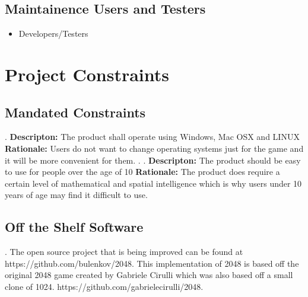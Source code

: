 \documentclass[12pt]{amsart}
\begin{document}
\subsection{Maintainence Users and Testers}
\begin{itemize}
\item Developers/Testers
\end{itemize}

\section{Project Constraints}
\subsection{Mandated Constraints}
.\newline
\textbf{Descripton:} The product shall operate using Windows, Mac OSX and LINUX
\textbf{Rationale:} Users do not want to change operating systems just for the game and it will be more convenient for them. 
.\newline
.\newline
\textbf{Descripton:} The product should be easy to use for people over the age of 10
\textbf{Rationale:} The product does require a certain level of mathematical and spatial intelligence which is why users under 10 years of age may find it difficult to use. 

\subsection{Off the Shelf Software}
.\newline
The open source project that is being improved can be found at https://github.com/bulenkov/2048.
This implementation of 2048 is based off the original 2048 game created by Gabriele Cirulli which was also based off a small clone of 1024. https://github.com/gabrielecirulli/2048.
\end{document}
